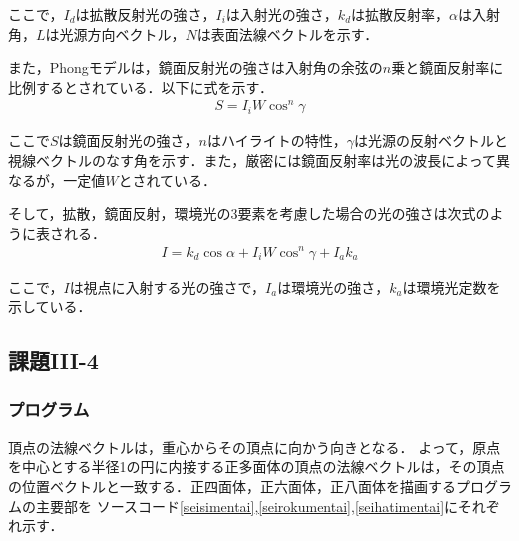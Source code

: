 \documentclass[]{jarticle}
\begin{document}
ここで，$I_d$は拡散反射光の強さ，$I_i$は入射光の強さ，$k_d$は拡散反射率，$\alpha$は入射角，$L$は光源方向ベクトル，$N$は表面法線ベクトルを示す．

また，Phongモデルは，鏡面反射光の強さは入射角の余弦の$n$乗と鏡面反射率に比例するとされている．以下に式を示す．
\begin{eqnarray*}
  S = I_i W \cos^n\gamma
\end{eqnarray*}

ここで$S$は鏡面反射光の強さ，$n$はハイライトの特性，$\gamma$は光源の反射ベクトルと視線ベクトルのなす角を示す．また，厳密には鏡面反射率は光の波長によって異なるが，一定値$W$とされている．

そして，拡散，鏡面反射，環境光の3要素を考慮した場合の光の強さは次式のように表される．
\begin{eqnarray*}
  I = k_d \cos\alpha + I_i W \cos^n \gamma + I_a k_a
\end{eqnarray*}

ここで，$I$は視点に入射する光の強さで，$I_a$は環境光の強さ，$k_a$は環境光定数を示している．

\subsection{課題III-4}

\subsubsection{プログラム}
頂点の法線ベクトルは，重心からその頂点に向かう向きとなる．
よって，原点を中心とする半径1の円に内接する正多面体の頂点の法線ベクトルは，その頂点の位置ベクトルと一致する．正四面体，正六面体，正八面体を描画するプログラムの主要部を
ソースコード\ref{seisimentai},\ref{seirokumentai},\ref{seihatimentai}にそれぞれ示す．
\end{document}
